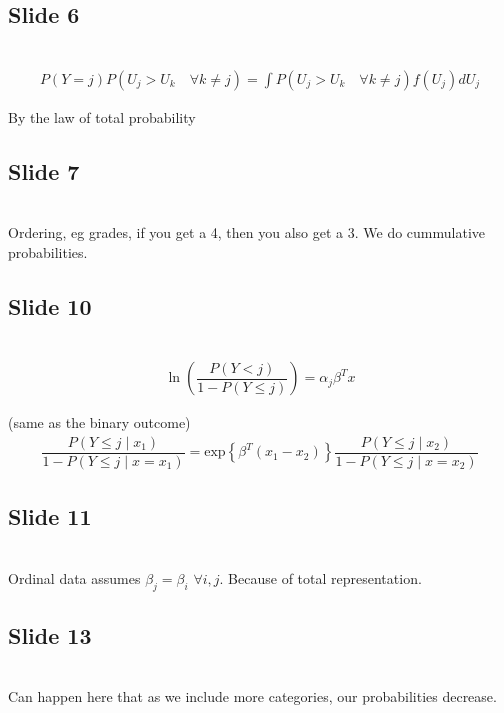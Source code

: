 \subsection{Slide 6}\hfill\\
\begin{equation*}
  \begin{gathered}
    P(Y=j)  P(U_j>U_k\quad\forall k\neq j) = \int P(U_j>U_k\quad\forall k\neq j)f(U_j)dU_j
  \end{gathered}
\end{equation*}\par
\noindent By the law of total probability
\par\bigskip
\subsection{Slide 7}\hfill\\
\noindent Ordering, eg grades, if you get a 4, then you also get a 3. We do cummulative probabilities.
\par\bigskip
\subsection{Slide 10}\hfill\\
\begin{equation*}
  \begin{gathered}
    \ln{\left(\dfrac{P(Y<j)}{1-P(Y\leq j)}\right)} = \alpha_j\beta^Tx
  \end{gathered}
\end{equation*}\par
\noindent (same as the binary outcome)
\begin{equation*}
  \begin{gathered}
    \dfrac{P(Y\leq j\mid x_1)}{1-P(Y\leq j\mid x=x_1)} = \text{exp}\left\{\beta^T(x_1-x_2)\right\}\dfrac{P(Y\leq j\mid x_2)}{1-P(Y\leq j\mid x=x_2)}
  \end{gathered}
\end{equation*}
\par\bigskip
\subsection{Slide 11}\hfill\\
\noindent Ordinal data assumes $\beta_j=\beta_i$ $\forall i,j$. Because of total representation.
\par\bigskip
\subsection{Slide 13}\hfill\\
\noindent Can happen here that as we include more categories, our probabilities decrease.
